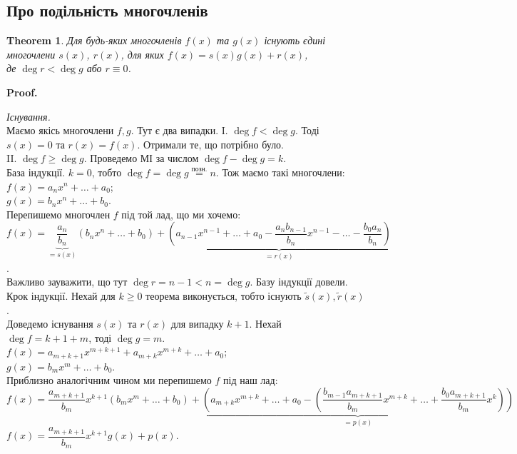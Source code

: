 \documentclass[a4paper, 10pt]{extarticle}
\makeatletter
\def\qed{$\blacksquare$}
\def\qed{$\blacksquare$}
\theoremstyle{theoremdd}
\newtheorem{theorem}{Theorem}[subsection]
\theoremstyle{theoremdd}
\theoremstyle{theoremdd}
\theoremstyle{theoremdd}
\theoremstyle{theoremdd}
\theoremstyle{theoremdd}
\theoremstyle{theoremdd}
\theoremstyle{theoremdd}
\renewenvironment{proof}[1][Proof.\\]{\par
\pushQED{\hfill \qed}%
\normalfont \topsep6\p@\@plus6\p@\relax
\trivlist
\item\relax
{\bfseries
#1\@addpunct{.}}\hspace\labelsep\ignorespaces
}{%
\popQED\endtrivlist\@endpefalse
}
\makeatother
\begin{document}
\subsection{Про подільність многочленів}
\begin{theorem}
Для будь-яких многочленів $f(x)$ та $g(x)$ існують \textit{єдині} многочлени $s(x)$, $r(x)$, для яких $f(x) = s(x) g(x) + r(x)$,\\
де $\deg r < \deg g$ або $r \equiv 0$.
\end{theorem}

\begin{proof}
\textit{Існування.}\\
Маємо якісь многочлени $f,g$. Тут є два випадки.
I. $\deg f < \deg g$. Тоді $s(x) = 0$ та $r(x) = f(x)$. Отримали те, що потрібно було.
\bigskip \\
II. $\deg f \geq \deg g$. Проведемо МІ за числом $\deg f -\deg g = k$.\\
База індукції. $k = 0$, тобто $\deg f = \deg g \overset{\text{позн.}}{=} n$.
Тож маємо такі многочлени:\\
$f(x) = a_n x^n + \dots + a_0$;\\
$g(x) = b_n x^n + \dots + b_0$.\\
Перепишемо многочлен $f$ під той лад, що ми хочемо:\\
$f(x) = \underbrace{\dfrac{a_n}{b_n}}_{=s(x)} (b_n x^n + \dots + b_0) + \underbrace{\left(a_{n-1}x^{n-1}+\dots+a_0 - \dfrac{a_n b_{n-1}}{b_n}x^{n-1}- \dots - \dfrac{b_0 a_n}{b_n} \right)}_{= r(x)}$.\\
Важливо зауважити, що тут $\deg r =n-1 < n = \deg g$. Базу індукції довели.
\bigskip \\
Крок індукції. Нехай для $k \geq 0$ теорема виконується, тобто існують $\tilde{s}(x), \tilde{r}(x)$.
\bigskip \\
Доведемо існування $s(x)$ та $r(x)$ для випадку $k+1$. Нехай $\deg f = k+1+m$, тоді $\deg g = m$.\\
$f(x) = a_{m+k+1} x^{m+k+1} + a_{m+k}x^{m+k} + \dots + a_0$;\\
$g(x) = b_m x^m + \dots + b_0$.\\
Приблизно аналогічним чином ми перепишемо $f$ під наш лад:\\
$f(x) = \dfrac{a_{m+k+1}}{b_m}x^{k+1} (b_m x^m + \dots + b_0)
+ \underbrace{\left(a_{m+k}x^{m+k} + \dots + a_0 - \left(\dfrac{b_{m-1}a_{m+k+1}}{b_m}x^{m+k} + \dots + \dfrac{b_0 a_{m+k+1}}{b_m}x^k \right) \right)}_{=p(x)}$\\
$f(x) = \dfrac{a_{m+k+1}}{b_m}x^{k+1}g(x) + p(x)$.\\

\end{proof}
\end{document}
